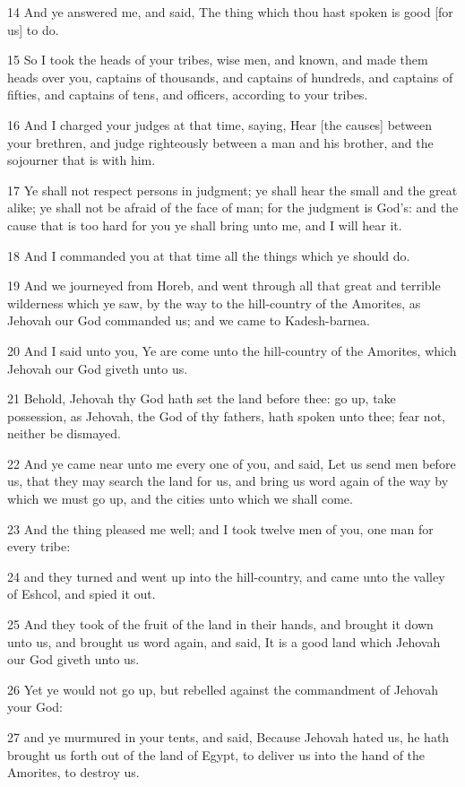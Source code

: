 \par 14 And ye answered me, and said, The thing which thou hast spoken is good [for us] to do.
\par 15 So I took the heads of your tribes, wise men, and known, and made them heads over you, captains of thousands, and captains of hundreds, and captains of fifties, and captains of tens, and officers, according to your tribes.
\par 16 And I charged your judges at that time, saying, Hear [the causes] between your brethren, and judge righteously between a man and his brother, and the sojourner that is with him.
\par 17 Ye shall not respect persons in judgment; ye shall hear the small and the great alike; ye shall not be afraid of the face of man; for the judgment is God's: and the cause that is too hard for you ye shall bring unto me, and I will hear it.
\par 18 And I commanded you at that time all the things which ye should do.
\par 19 And we journeyed from Horeb, and went through all that great and terrible wilderness which ye saw, by the way to the hill-country of the Amorites, as Jehovah our God commanded us; and we came to Kadesh-barnea.
\par 20 And I said unto you, Ye are come unto the hill-country of the Amorites, which Jehovah our God giveth unto us.
\par 21 Behold, Jehovah thy God hath set the land before thee: go up, take possession, as Jehovah, the God of thy fathers, hath spoken unto thee; fear not, neither be dismayed.
\par 22 And ye came near unto me every one of you, and said, Let us send men before us, that they may search the land for us, and bring us word again of the way by which we must go up, and the cities unto which we shall come.
\par 23 And the thing pleased me well; and I took twelve men of you, one man for every tribe:
\par 24 and they turned and went up into the hill-country, and came unto the valley of Eshcol, and spied it out.
\par 25 And they took of the fruit of the land in their hands, and brought it down unto us, and brought us word again, and said, It is a good land which Jehovah our God giveth unto us.
\par 26 Yet ye would not go up, but rebelled against the commandment of Jehovah your God:
\par 27 and ye murmured in your tents, and said, Because Jehovah hated us, he hath brought us forth out of the land of Egypt, to deliver us into the hand of the Amorites, to destroy us.
